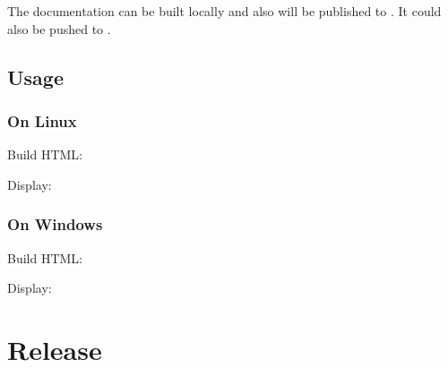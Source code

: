 \documentclass[letterpaper,10pt,english]{sphinxmanual}
\begin{document}
The documentation can be built locally and also will be published to .
It could also be pushed to .


\subsection{Usage}
\label{\detokenize{documentation:usage}}

\subsubsection{On Linux}
\label{\detokenize{documentation:on-linux}}
Build HTML:

\begin{sphinxVerbatim}[commandchars=\\\{\}]
 
\end{sphinxVerbatim}

Display:

\begin{sphinxVerbatim}[commandchars=\\\{\}]
 
\end{sphinxVerbatim}


\subsubsection{On Windows}
\label{\detokenize{documentation:on-windows}}
Build HTML:

\begin{sphinxVerbatim}[commandchars=\\\{\}]
 
\end{sphinxVerbatim}

Display:

\begin{sphinxVerbatim}[commandchars=\\\{\}]
 
\end{sphinxVerbatim}


\section{Release}
\label{\detokenize{release:release}}\label{\detokenize{release:id1}}\label{\detokenize{release::doc}}
\end{document}
